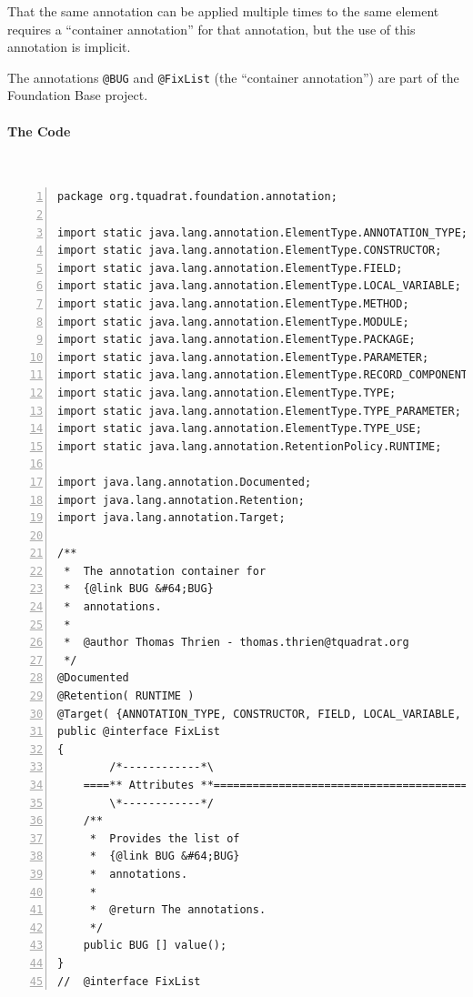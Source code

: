 \documentclass[11pt,a4paper, titlepage, parskip=half, headsepline, footsepline, cleardoublepage=current, headheight=1cm]{scrbook}
\begin{document}
That the same annotation can be applied multiple times to the same element requires a “container annotation” for that annotation\autocite{ORACLE_DOC_LANGUAGE_SPECIFICATION:RepeatableAnnotationInterfaces}, but the use of this annotation is implicit.

The annotations \lstinline|@BUG| and \lstinline|@FixList| (the “container annotation”) are part of the Foundation Base project\autocite{TQUADRAT_ORG_FOUNDATION_BASE, TQUADRAT_ORG_FOUNDATION_BUG, TQUADRAT_ORG_FOUNDATION_FIXLIST}.

\paragraph{The Code} \
\begin{lstlisting}[numbers=left,caption={FixList.java}]
package org.tquadrat.foundation.annotation;

import static java.lang.annotation.ElementType.ANNOTATION_TYPE;
import static java.lang.annotation.ElementType.CONSTRUCTOR;
import static java.lang.annotation.ElementType.FIELD;
import static java.lang.annotation.ElementType.LOCAL_VARIABLE;
import static java.lang.annotation.ElementType.METHOD;
import static java.lang.annotation.ElementType.MODULE;
import static java.lang.annotation.ElementType.PACKAGE;
import static java.lang.annotation.ElementType.PARAMETER;
import static java.lang.annotation.ElementType.RECORD_COMPONENT;
import static java.lang.annotation.ElementType.TYPE;
import static java.lang.annotation.ElementType.TYPE_PARAMETER;
import static java.lang.annotation.ElementType.TYPE_USE;
import static java.lang.annotation.RetentionPolicy.RUNTIME;

import java.lang.annotation.Documented;
import java.lang.annotation.Retention;
import java.lang.annotation.Target;

/**
 *  The annotation container for
 *  {@link BUG &#64;BUG}
 *  annotations.
 *
 *  @author Thomas Thrien - thomas.thrien@tquadrat.org
 */
@Documented
@Retention( RUNTIME )
@Target( {ANNOTATION_TYPE, CONSTRUCTOR, FIELD, LOCAL_VARIABLE, METHOD, MODULE, PACKAGE, PARAMETER, RECORD_COMPONENT, TYPE, TYPE_PARAMETER, TYPE_USE} )
public @interface FixList
{
        /*------------*\
    ====** Attributes **=============================================
        \*------------*/
    /**
     *  Provides the list of
     *  {@link BUG &#64;BUG}
     *  annotations.
     *
     *  @return The annotations.
     */
    public BUG [] value();
}
//  @interface FixList
\end{lstlisting}
\end{document}
